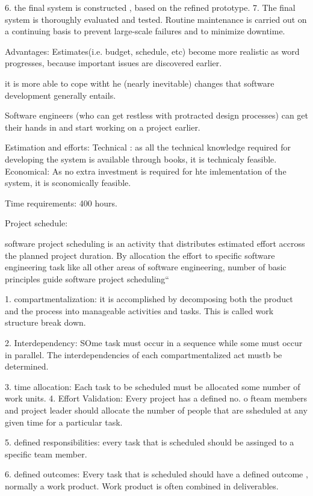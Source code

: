 6. the final system is constructed , based on the refined prototype. 
7. The final system is thoroughly evaluated and tested. Routine maintenance is carried out on a continuing basis to prevent large-scale failures and to minimize downtime. 

Advantages: 
  Estimates(i.e. budget, schedule, etc) become more realistic as word progresses, because important issues are discovered earlier. 

it is more able to cope witht he (nearly inevitable) changes that software development generally entails. 

Software engineers (who can get restless with protracted design processes) can get their hands in and start working on a project earlier. 





Estimation and efforts: 
Technical : as all the technical knowledge required for developing the system is available through books, it is technicaly feasible. 
Economical: As no extra investment is required for hte imlementation of the system, it is sconomically feasible. 

Time requirements: 400 hours. 

Project schedule: 

  software project scheduling is an activity that distributes estimated effort accross the planned project duration. By allocation the effort to specific software engineering task like all other areas of software engineering, number of basic principles guide software project scheduling`` 

1. compartmentalization: 
it is accomplished by  decomposing both the product and the process into manageable activities and tasks. This is called work structure break down. 

2. Interdependency: 
SOme task must occur in a sequence while some must occur in parallel. The interdependencies of each compartmentalized act mustb be determined. 

3. time allocation: 
Each task to be scheduled must be allocated some number of work units. 
4. Effort Validation:
  Every project has a defined no. o fteam members and project leader should allocate the number of people that are ssheduled at any given time for a particular task. 

5. defined responsibilities: 
  every task  that is scheduled should be assinged to a specific team member. 

6. defined outcomes: 
Every task that is scheduled should have a defined outcome , normally a work product. Work product is often combined in deliverables. 

